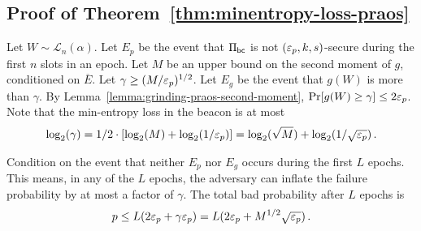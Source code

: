 

%
%
%







\subsection{Proof of Theorem~\ref{thm:minentropy-loss-praos}}\label{sec:proof-praos-theorem}

Let $W \sim \mathcal{L}_n(\alpha)$. 
Let $E_p$ be the event that 
$\Pi_\mathsf{bc}$ is not $(\mathsf{\varepsilon}_p, k, s)$-secure during 
the first $n$ slots in an epoch. 
Let $M$ be an upper bound on the second moment of $g$, 
conditioned on $\overline{E}$. 
Let $\gamma \geq (M/\mathsf{\varepsilon}_p)^{1/2}$. 
Let $E_g$ be the event that $g(W)$ is more than $\gamma$.
By Lemma~\ref{lemma:grinding-praos-second-moment}, 
$\Pr[g(W) \geq \gamma] \leq 2 \mathsf{\varepsilon}_p$. 
Note that the min-entropy loss in the beacon is at most 
\begin{equation}\label{eq:log-gamma}
 \log_2(\gamma) 
 = 1/2 \cdot [\log_2(M) + \log_2(1/\mathsf{\varepsilon}_p)]
 = \log_2(\sqrt{M}) + \log_2(1/\sqrt{\mathsf{\varepsilon}_p})
 \,. 
\end{equation}


Condition on the event that neither $E_p$ nor $E_g$ 
occurs during the first $L$ epochs. 
This means, in any of the $L$ epochs, 
the adversary can inflate the failure probability 
by at most a factor of $\gamma$.
The total bad probability after $L$ epochs is
$$
  p
  \leq L (2 \mathsf{\varepsilon}_p + \gamma \mathsf{\varepsilon}_p)
  = L (2 \mathsf{\varepsilon}_p + M^{1/2} \sqrt{\mathsf{\varepsilon}_p})
  \,.
$$


